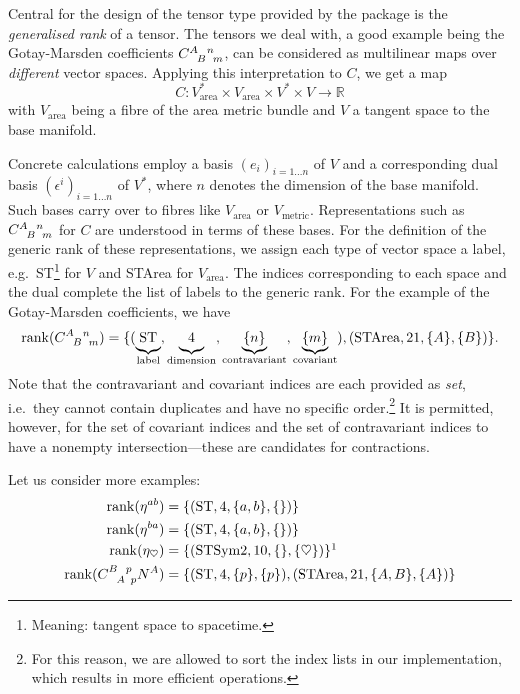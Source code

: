 Central for the design of the tensor type provided by the package is the \emph{generalised rank} of a tensor. The tensors we deal with, a good example being the Gotay-Marsden coefficients $\gmc{A}{B}{n}{m}$, can be considered as multilinear maps over \emph{different} vector spaces. Applying this interpretation to $C$, we get a map
\begin{equation}
  C \colon V_\text{area}^\ast \times V_\text{area} \times V^\ast \times V \rightarrow \mathbb R
\end{equation}
with $V_\text{area}$ being a fibre of the area metric bundle and $V$ a tangent space to the base manifold.

Concrete calculations employ a basis $(e_i)_{i=1\dots n}$ of $V$ and a corresponding dual basis $(\epsilon^i)_{i=1\dots n}$ of $V^\ast$, where $n$ denotes the dimension of the base manifold. Such bases carry over to fibres like $V_\text{area}$ or $V_\text{metric}$. Representations such as $\gmc{A}{B}{n}{m}$ for $C$ are understood in terms of these bases. For the definition of the generic rank of these representations, we assign each type of vector space a label, e.g.\ ST\footnote{Meaning: tangent space to spacetime.} for $V$ and STArea for $V_\text{area}$. The indices corresponding to each space and the dual complete the list of labels to the generic rank. For the example of the Gotay-Marsden coefficients, we have
\begin{equation}
  \operatorname{rank}(\gmc{A}{B}{n}{m}) = \{(\underbrace{\vphantom{\{}\text{ST}}_{\text{label}}, \underbrace{\vphantom{\{}4}_{\text{dimension}}, \underbrace{\{n\}}_{\text{contravariant}}, \underbrace{\{m\}}_{\text{covariant}}), (\text{STArea}, 21, \{A\}, \{B\})\}.
\end{equation}
Note that the contravariant and covariant indices are each provided as \emph{set}, i.e.\ they cannot contain duplicates and have no specific order.\footnote{For this reason, we are allowed to sort the index lists in our implementation, which results in more efficient operations.} It is permitted, however, for the set of covariant indices and the set of contravariant indices to have a nonempty intersection---these are candidates for contractions.

Let us consider more examples:
\begin{align}
  \operatorname{rank}(\eta^{ab}) = {} & \{(\text{ST}, 4, \{a,b\}, \{\})\} \\
  \operatorname{rank}(\eta^{ba}) = {} & \{(\text{ST}, 4, \{a,b\}, \{\})\} \\
  \operatorname{rank}(\eta_{\heartsuit}) = {} & \{(\text{STSym2}, 10, \{\}, \{\heartsuit\})\}\footnotemark \\
  \operatorname{rank}(\gmc{B}{A}{p}{p} N^A) = {} & \{(\text{ST}, 4, \{p\}, \{p\}), (\text{STArea}, 21, \{A,B\}, \{A\})\} \label{eq_to_contract}
\end{align}

